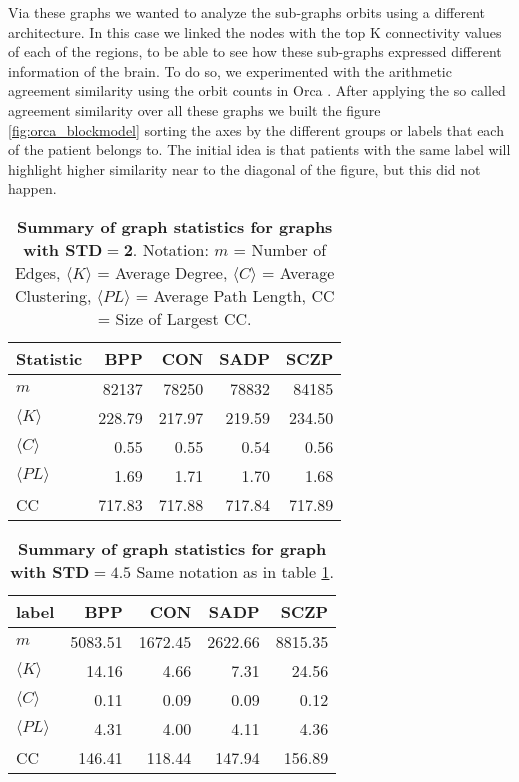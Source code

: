 \documentclass[fleqn,moreauthors,10pt]{ds_report}
\begin{document}
Via these graphs we wanted to analyze the sub-graphs orbits using a different architecture. In this case we linked the nodes with the top K connectivity values of each of the regions, to be able to see how these sub-graphs expressed different information of the brain. To do so, we experimented with the arithmetic agreement similarity using the orbit counts in Orca \cite{orca}. After applying the so called agreement similarity over all these graphs we built the figure \ref{fig:orca_blockmodel}  sorting the axes by the different groups or labels that each of the patient belongs to. The initial idea is that patients with the same label will highlight higher similarity near to the diagonal of the figure, but this did not happen.  

\begin{table}[h!]
\centering
\caption{\textbf{Summary of graph statistics for graphs with $\bm{STD=2}$}. Notation:  $m$ = Number of Edges, $\langle K \rangle$ = Average Degree, $\langle C \rangle$ = Average Clustering, $\langle PL \rangle$ = Average Path Length, CC = Size of Largest CC.}
\label{tab:graph_statistics_2}
\begin{tabular}{lrrrr}
\toprule
Statistic &       BPP &       CON &      SADP &      SCZP \\
\midrule
$m$                &  82137&  78250 &  78832 &  84185 \\
$\langle K \rangle$              &    228.79 &    217.97 &    219.59 &    234.50 \\
$\langle C \rangle$              &      0.55 &      0.55 &      0.54 &      0.56 \\
$\langle PL \rangle$             &      1.69 &      1.71 &      1.70 &      1.68 \\
CC               &    717.83 &    717.88 &    717.84 &    717.89 \\
\bottomrule
\end{tabular}
\end{table}

\begin{table}[h!]
\centering
\caption{\textbf{Summary of graph statistics for graph with  $\bm{STD=4.5}$} Same notation as in table \ref{tab:graph_statistics_2}.}
\label{tab:graph_statistics_4-5}
\begin{tabular}{lrrrr}
\toprule
label &      BPP &      CON &     SADP &     SCZP \\
\midrule
$m$                &  5083.51 &  1672.45 &  2622.66 &  8815.35 \\
$\langle K \rangle$              &    14.16 &     4.66 &     7.31 &    24.56 \\
$\langle C \rangle$              &     0.11 &     0.09 &     0.09 &     0.12 \\
$\langle PL \rangle$             &     4.31 &     4.00 &     4.11 &     4.36 \\
CC               &   146.41 &   118.44 &   147.94 &   156.89 \\
\bottomrule
\end{tabular}
\end{table}
\end{document}

